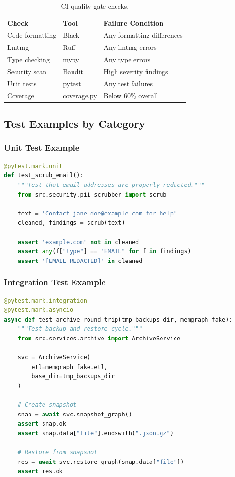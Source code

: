 \begin{table}[ht]
\centering
\caption{CI quality gate checks.}
\label{tab:ci-gates}
\small
\begin{tabular}{lll}
\hline
\textbf{Check} & \textbf{Tool} & \textbf{Failure Condition} \\
\hline
Code formatting & Black & Any formatting differences \\
Linting & Ruff & Any linting errors \\
Type checking & mypy & Any type errors \\
Security scan & Bandit & High severity findings \\
Unit tests & pytest & Any test failures \\
Coverage & coverage.py & Below 60\% overall \\
\hline
\end{tabular}
\end{table}

\subsection{Test Examples by Category}

\subsubsection{Unit Test Example}

\begin{lstlisting}[language=Python, caption={Unit test for PII scrubbing.}]
@pytest.mark.unit
def test_scrub_email():
    """Test that email addresses are properly redacted."""
    from src.security.pii_scrubber import scrub
    
    text = "Contact jane.doe@example.com for help"
    cleaned, findings = scrub(text)
    
    assert "example.com" not in cleaned
    assert any(f["type"] == "EMAIL" for f in findings)
    assert "[EMAIL_REDACTED]" in cleaned
\end{lstlisting}

\subsubsection{Integration Test Example}

\begin{lstlisting}[language=Python, caption={Integration test for archive service.}]
@pytest.mark.integration
@pytest.mark.asyncio
async def test_archive_round_trip(tmp_backups_dir, memgraph_fake):
    """Test backup and restore cycle."""
    from src.services.archive import ArchiveService
    
    svc = ArchiveService(
        etl=memgraph_fake.etl, 
        base_dir=tmp_backups_dir
    )
    
    # Create snapshot
    snap = await svc.snapshot_graph()
    assert snap.ok
    assert snap.data["file"].endswith(".json.gz")
    
    # Restore from snapshot
    res = await svc.restore_graph(snap.data["file"])
    assert res.ok
\end{lstlisting}

